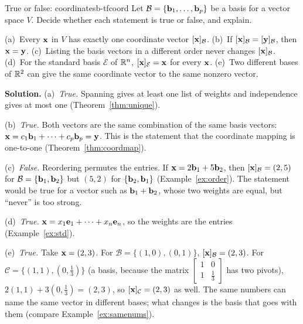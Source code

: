 \documentclass[11pt]{article}
\begin{document}
\begin{exmp}{True or false: coordinates}{b-tfcoord}
Let $\mathcal{B}=\{\mathbf{b}_1,\dots,\mathbf{b}_p\}$ be a basis for a vector space $V$. Decide whether each statement is true or false, and explain.

(a)~Every $\mathbf{x}$ in $V$ has exactly one coordinate vector $[\mathbf{x}]_{\mathcal{B}}$.
(b)~If $[\mathbf{x}]_{\mathcal{B}}=[\mathbf{y}]_{\mathcal{B}}$, then $\mathbf{x}=\mathbf{y}$.
(c)~Listing the basis vectors in a different order never changes $[\mathbf{x}]_{\mathcal{B}}$.
(d)~For the standard basis $\mathcal{E}$ of $\mathbb{R}^n$, $[\mathbf{x}]_{\mathcal{E}}=\mathbf{x}$ for every $\mathbf{x}$.
(e)~Two different bases of $\mathbb{R}^2$ can give the same coordinate vector to the same nonzero vector.

\textbf{Solution.} (a)~\emph{True.} Spanning gives at least one list of weights and independence gives at most one (Theorem~\ref{thm:unique}).

(b)~\emph{True.} Both vectors are the same combination of the same basis vectors: $\mathbf{x}=c_1\mathbf{b}_1+\cdots+c_p\mathbf{b}_p=\mathbf{y}$. This is the statement that the coordinate mapping is one-to-one (Theorem~\ref{thm:coordmap}).

(c)~\emph{False.} Reordering permutes the entries. If $\mathbf{x}=2\mathbf{b}_1+5\mathbf{b}_2$, then $[\mathbf{x}]_{\mathcal{B}}=(2,5)$ for $\mathcal{B}=\{\mathbf{b}_1,\mathbf{b}_2\}$ but $(5,2)$ for $\{\mathbf{b}_2,\mathbf{b}_1\}$ (Example~\ref{ex:order}). The statement would be true for a vector such as $\mathbf{b}_1+\mathbf{b}_2$, whose two weights are equal, but ``never'' is too strong.

(d)~\emph{True.} $\mathbf{x}=x_1\mathbf{e}_1+\cdots+x_n\mathbf{e}_n$, so the weights are the entries (Example~\ref{ex:std}).

(e)~\emph{True.} Take $\mathbf{x}=(2,3)$. For $\mathcal{B}=\{(1,0),(0,1)\}$, $[\mathbf{x}]_{\mathcal{B}}=(2,3)$. For $\mathcal{C}=\{(1,1),(0,\tfrac13)\}$ (a basis, because the matrix $\begin{bmatrix}1&0\\1&\tfrac13\end{bmatrix}$ has two pivots), $2(1,1)+3(0,\tfrac13)=(2,3)$, so $[\mathbf{x}]_{\mathcal{C}}=(2,3)$ as well. The same numbers can name the same vector in different bases; what changes is the basis that goes with them (compare Example~\ref{ex:samenums}).
\end{exmp}
\end{document}
